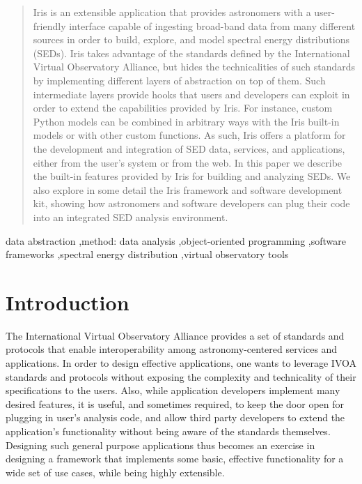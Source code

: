 \documentclass[preprint,authoryear,5p]{elsarticle}
\begin{document}
\begin{frontmatter}
\begin{abstract}
Iris is an extensible application that provides astronomers with a user-friendly
interface capable of ingesting broad-band data from many different sources
in order to build, explore, and model spectral energy distributions (SEDs). Iris
takes advantage of the standards defined by the International Virtual
Observatory Alliance, but hides the technicalities of such standards by
implementing different layers of abstraction on top of them. Such intermediate
layers provide hooks that users and developers can exploit in order to extend
the capabilities provided by Iris. For instance, custom Python models can be
combined in arbitrary ways with the Iris built-in models or with other custom
functions. As such, Iris offers a platform for the development and integration
of SED data, services, and applications, either from the user's system or from
the web. In this paper we describe the built-in features provided by Iris for
building and analyzing SEDs. We also explore in some detail the Iris framework
and software development kit, showing how astronomers and software developers
can plug their code into an integrated SED analysis environment.  \end{abstract}




\begin{keyword}
data abstraction \sep method: data analysis \sep object-oriented programming \sep software frameworks \sep spectral energy distribution \sep virtual observatory tools
\end{keyword}

\end{frontmatter}




\label{sec:introduction} \section{Introduction} 
\begin{sloppypar}
The International Virtual
Observatory Alliance \citep[IVOA;][]{2004SPIE.5493..137Q} provides a set of
standards and protocols that enable interoperability among astronomy-center\-ed
services and applications. In order to design effective applications, one wants
to leverage IVOA standards and protocols without exposing the complexity and
technicality of their specifications to the users. Also, while application
developers implement many desired features, it is useful, and sometimes required, to keep the door open
for plugging in user's analysis code, and allow third party developers to extend
the application's functionality without being aware of the standards themselves.
Designing such general purpose applications thus becomes an exercise in
designing a framework that implements some basic, effective functionality for a
wide set of use cases, while being highly extensible.
\end{sloppypar}
\end{document}
